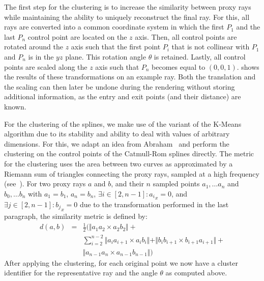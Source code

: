 The first step for the clustering is to increase the similarity between proxy rays while maintaining the ability to uniquely reconstruct the final ray. For this, all rays are converted into a common coordinate system in which the first $P_1$ and the last $P_n$ control point are located on the $z$ axis. Then, all control points are rotated around the $z$ axis such that the first point $P_i$ that is not collinear with $P_1$ and $P_n$ is in the $yz$ plane. This rotation angle $\theta$ is retained. Lastly, all control points are scaled along the $z$ axis such that $P_n$ becomes equal to $(0,0,1)$.  shows the results of these transformations on an example ray. Both the translation and the scaling can then later be undone during the rendering without storing additional information, as the entry and exit points (and their distance) are known.

For the clustering of the splines, we make use of the variant of the  K-Means~\cite{hartigan75kmeans} algorithm due to its stability and ability to deal with values of arbitrary dimensions. For this, we adapt an idea from Abraham~\etal \cite{abraham03clustering} and perform the clustering on the control points of the Catmull-Rom splines directly. The metric for the clustering uses the area between two curves as approximated by a Riemann sum of triangles connecting the proxy rays, sampled at a high frequency (see~). For two proxy rays $a$ and $b$, and their $n$ sampled points $a_1, \dots a_n$ and $b_0, \dots b_n$ with $a_1 = b_1$, $a_n = b_n$, $\exists i\in[2, n-1] : a{_i}_x = 0$, and $\exists j\in[2, n-1] : b{_j}_x = 0$ due to the transformation performed in the last paragraph, the similarity metric is defined by:
\begin{eqnarray}
d(a,b) &=& \frac{1}{2} \Big( \Vert a_1a_2 \times a_2b_2\Vert + \nonumber \\
&& \sum_{i=2}^{n-2}\Vert a_ia_{i+1} \times a_ib_i \Vert + \Vert b_ib_{i+1} \times b_{i+1}a_{i+1}\Vert + \\
&& \Vert a_{n-1}a_n \times a_{n-1}b_{n-1}\Vert \Big) \nonumber 
\end{eqnarray}
After applying the clustering, for each original point we now have a cluster identifier for the representative ray and the angle $\theta$ as computed above.

